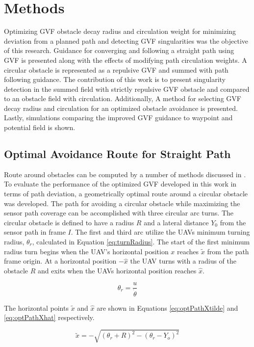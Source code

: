 \documentclass[conf]{new-aiaa}
\begin{document}
\section{Methods}
Optimizing GVF obstacle decay radius and circulation weight for minimizing deviation from a planned path and detecting GVF singularities was the objective of this research. Guidance for converging and following a straight path using GVF is presented along with the effects of modifying path circulation weights. A circular obstacle is represented as a repulsive GVF and summed with path following guidance. The contribution of this work is to present singularity detection in the summed field with strictly repulsive GVF obstacle and compared to an obstacle field with circulation. Additionally, A method for selecting GVF decay radius and circulation for an optimized obstacle avoidance is presented. Lastly, simulations comparing the improved GVF guidance to waypoint and potential field is shown. 


\subsection{Optimal Avoidance Route for Straight Path}
Route around obstacles can be computed by a number of methods discussed in \cite{goerzen_survey_2010}. To evaluate the performance of the optimized GVF developed in this work in terms of path deviation, a geometrically optimal route around a circular obstacle was developed. The path for avoiding a circular obstacle while maximizing the sensor path coverage can be accomplished with three circular arc turns. The circular obstacle is defined to have a radius $R$ and a lateral distance $Y_0$ from the sensor path in frame $I$. The first and third arc utilize the UAVs minimum turning radius, $\theta_r$, calculated in Equation \ref{eq:turnRadius}. The start of the first minimum radius turn begins when the UAV's horizontal position $x$ reaches  $\tilde{x}$ from the path frame origin. At a horizontal position $-\hat{x}$ the UAV turns with a radius of the obstacle $R$ and exits when the UAVs horizontal position reaches $\hat{x}$. 

\begin{equation}
\label{eq:turnRadius}
\theta_r = \frac{u}{\dot{\theta}}
\end{equation}

The horizontal points $\tilde{x}$ and $\hat{x}$ are shown in Equations \ref{eq:optPathXtilde} and \ref{eq:optPathXhat} respectively. 

\begin{equation}
\label{eq:optPathXtilde}
\widetilde{x} = -\sqrt{(\theta_r+R)^2 - (\theta_r-Y_o)^2}
\end{equation}
\end{document}
